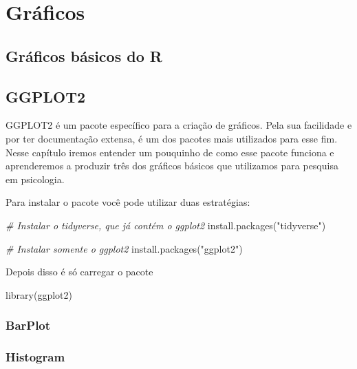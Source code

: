 \documentclass[
]{book}
\newenvironment{Shaded}{\begin{snugshade}}{\end{snugshade}}
\newcommand{\CommentTok}[1]{\textcolor[rgb]{0.56,0.35,0.01}{\textit{#1}}}
\newcommand{\FunctionTok}[1]{\textcolor[rgb]{0.00,0.00,0.00}{#1}}
\newcommand{\NormalTok}[1]{#1}
\newcommand{\StringTok}[1]{\textcolor[rgb]{0.31,0.60,0.02}{#1}}
\begin{document}
\hypertarget{graficos}{%
\chapter{Gráficos}\label{graficos}}

\hypertarget{gruxe1ficos-buxe1sicos-do-r}{%
\section{Gráficos básicos do R}\label{gruxe1ficos-buxe1sicos-do-r}}

\hypertarget{ggplot2}{%
\section{GGPLOT2}\label{ggplot2}}

GGPLOT2 é um pacote específico para a criação de gráficos. Pela sua facilidade e por ter documentação extensa, é um dos pacotes mais utilizados para esse fim. Nesse capítulo iremos entender um pouquinho de como esse pacote funciona e aprenderemos a produzir três dos gráficos básicos que utilizamos para pesquisa em psicologia.

Para instalar o pacote você pode utilizar duas estratégias:

\begin{Shaded}
\begin{Highlighting}[]
\CommentTok{\# Instalar o tidyverse, que já contém o ggplot2}
\FunctionTok{install.packages}\NormalTok{(}\StringTok{"tidyverse"}\NormalTok{)}

\CommentTok{\# Instalar somente o ggplot2}
\FunctionTok{install.packages}\NormalTok{(}\StringTok{"ggplot2"}\NormalTok{)}
\end{Highlighting}
\end{Shaded}

Depois disso é só carregar o pacote

\begin{Shaded}
\begin{Highlighting}[]
\FunctionTok{library}\NormalTok{(ggplot2)}
\end{Highlighting}
\end{Shaded}

\hypertarget{barplot}{%
\subsection{BarPlot}\label{barplot}}

\hypertarget{histogram}{%
\subsection{Histogram}\label{histogram}}
\end{document}

